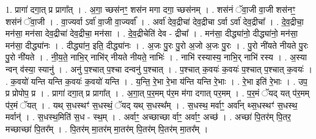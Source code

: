 \documentclass[17pt]{extarticle}
\begin{document}
1. प्रागा॑ दगा॒त् प्र प्रागा᳚त् । . अ॒गा॒ च्छस॑नꣳ॒॒ शस॑न मगा दगा॒ च्छस॑नम् । . शस॑नं ॅवा॒जी वा॒जी शस॑नꣳ॒॒ शस॑नं ॅवा॒जी । . वा॒ज्यर्वा ऽर्वा॑ वा॒जी वा॒ज्यर्वा᳚ । . अर्वा॑ देव॒द्रीचा॑ देव॒द्रीचा ऽर्वा ऽर्वा॑ देव॒द्रीचा᳚ । . दे॒व॒द्रीचा॒ मन॑सा॒ मन॑सा देव॒द्रीचा॑ देव॒द्रीचा॒ मन॑सा । . दे॒व॒द्रीचेति॑ देव - द्रीचा᳚ । . मन॑सा॒ दीद्ध्या॑नो॒ दीद्ध्या॑नो॒ मन॑सा॒ मन॑सा॒ दीद्ध्या॑नः । . दीद्ध्या॑न॒ इति॒ दीद्ध्या॑नः । . अ॒जः पु॒रः पु॒रो अ॒जो अ॒जः पु॒रः । . पु॒रो नी॑यते नीयते पु॒रः पु॒रो नी॑यते । . नी॒य॒ते॒ नाभि॒र् नाभि॑र् नीयते नीयते॒ नाभिः॑ । . नाभि॑ रस्यास्य॒ नाभि॒र् नाभि॑ रस्य । . अ॒स्या न्वन् व॑स्या॒ स्यानु॑ । . अनु॑ प॒श्चात् प॒श्चा दन्वनु॑ प॒श्चात् । . प॒श्चात् क॒वयः॑ क॒वयः॑ प॒श्चात् प॒श्चात् क॒वयः॑ । . क॒वयो॑ यन्ति यन्ति क॒वयः॑ क॒वयो॑ यन्ति । . य॒न्ति॒ रे॒भा रे॒भा य॑न्ति यन्ति रे॒भाः । . रे॒भा इति॑ रे॒भाः । . उप॒ प्र प्रोपोप॒ प्र । . प्रागा॑ दगा॒त् प्र प्रागा᳚त् । . अ॒गा॒त् प॒र॒मम् प॑र॒म म॑गा दगात् पर॒मम् । . प॒र॒मं ॅयद् यत् प॑र॒मम् प॑र॒मं ॅयत् । . यथ् स॒धस्थꣳ॑ स॒धस्थं॒ ॅयद् यथ् स॒धस्थ᳚म् । . स॒धस्थ॒ मर्वाꣳ॒॒ अर्वा᳚न् थ्स॒धस्थꣳ॑ स॒धस्थ॒ मर्वान्॑ । . स॒धस्थ॒मिति॑ स॒ध - स्थ॒म् । . अर्वाꣳ॒॒ अच्छाच्छा र्वाꣳ॒॒ अर्वाꣳ॒॒ अच्छ॑ । . अच्छा॑ पि॒तर॑म् पि॒तर॒ मच्छाच्छा॑ पि॒तर᳚म् । . पि॒तर॑म् मा॒तर॑म् मा॒तर॑म् पि॒तर॑म् पि॒तर॑म् मा॒तर᳚म् । \newline
\end{document}
